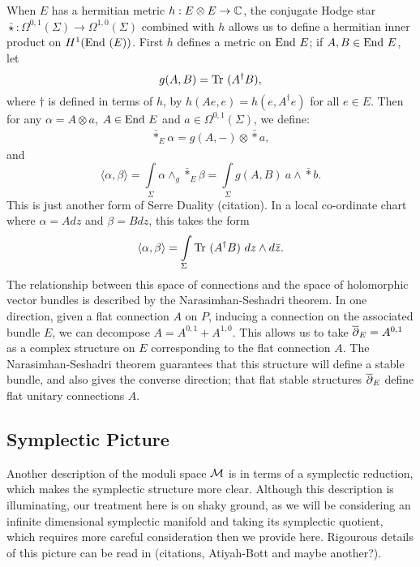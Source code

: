 	
	When $E$ has a hermitian metric $h:E\otimes E \to \mathbb{C}$, the conjugate Hodge star $\bar{\star}:\Omega^{0,1}(\Sigma) \to \Omega^{1,0}(\Sigma)$ combined with $h$ allows us to define a hermitian inner product on $H^1(\text{End } (E))$.  First $h$ defines a metric on $\text{End } E$; if $A,B\in \text{End } E$, let
	\begin{equation}
	g(A,B) = \text{Tr }(A^\dagger B),
	\end{equation}
	where $\dagger$ is defined in terms of $h$, by $h(Ae,e) = h(e,A^\dagger e)$ for all $e\in E$. Then for any $\alpha = A \otimes a$, $A\in \text{End } E$ and $a \in \Omega^{0,1}(\Sigma)$, we define:
	\begin{align}
	\bar{\ast}_E \alpha = g(A,-)\otimes \bar{\ast}a, 
	\end{align}
	and
	\begin{equation}
	\langle \alpha, \beta \rangle = \int\limits_\Sigma \alpha \wedge_g \bar{\ast}_E \beta =\int\limits_\Sigma g(A,B)~a\wedge \bar{\ast} b.
	\end{equation}
	This is just another form of Serre Duality (citation). In a local co-ordinate chart where $\alpha = Adz$ and $\beta = Bdz$, this takes the form
	\begin{equation}
	\langle \alpha, \beta \rangle = \int\limits_\Sigma \text{Tr }(A^\dagger B)~dz\wedge d\bar{z}.
	\end{equation}
	The relationship between this space of connections and the space of holomorphic vector bundles is described by the Narasimhan-Seshadri theorem. In one direction, given a flat connection $A$ on $P$, inducing a connection on the associated bundle $E$, we can decompose $A = A^{0,1} + A^{1,0}$. This allows us to take $\overline{\partial}_E = A^{0,1}$ as a complex structure on $E$ corresponding to the flat connection $A$. The Narasimhan-Seshadri theorem guarantees that this structure will define a stable bundle, and also gives the converse direction; that flat stable structures $\overline{\partial}_E$ define flat unitary connections $A$. 

	\subsection{Symplectic Picture}
	Another description of the moduli space $\mathcal{M}$ is in terms of a symplectic reduction, which makes the symplectic structure more clear. Although this description is illuminating, our treatment here is on shaky ground, as we will be considering an infinite dimensional symplectic manifold and taking its symplectic quotient, which requires more careful consideration then we provide here. Rigourous details of this picture can be read in (citations, Atiyah-Bott and maybe another?).
	
